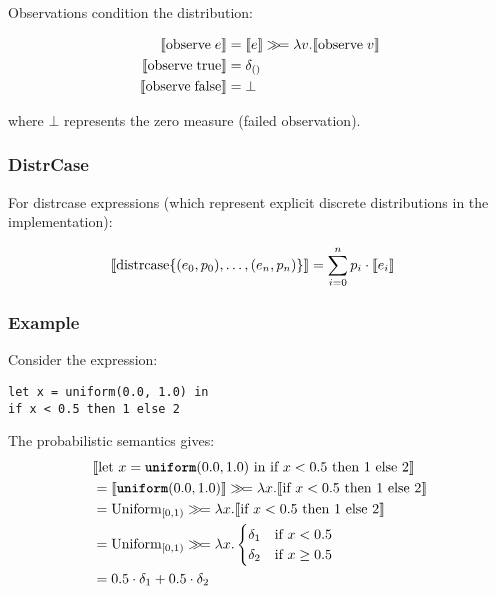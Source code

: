 Observations condition the distribution:

\begin{align*}
\llbracket  \text{observe}\; e  \rrbracket &= \llbracket  e  \rrbracket \gg\!= \lambda v. \llbracket  \text{observe}\; v  \rrbracket \\
\llbracket  \text{observe}\; \text{true}  \rrbracket &= \delta_{()} \\
\llbracket  \text{observe}\; \text{false}  \rrbracket &= \bot
\end{align*}

where $\bot$ represents the zero measure (failed observation).

\subsubsection{DistrCase}

For distrcase expressions (which represent explicit discrete distributions in the implementation):

\begin{align*}
\llbracket  \text{distrcase}\{(e_0, p_0), \ldots, (e_n, p_n)\}  \rrbracket &= \sum_{i=0}^n p_i \cdot \llbracket  e_i  \rrbracket
\end{align*}

\subsubsection{Example}

Consider the expression:
\begin{lstlisting}
let x = uniform(0.0, 1.0) in
if x < 0.5 then 1 else 2
\end{lstlisting}

The probabilistic semantics gives:
\begin{align*}
&\llbracket  \text{let } x = \text{\ttfamily\bfseries uniform}(0.0, 1.0) \text{ in if } x < 0.5 \text{ then } 1 \text{ else } 2  \rrbracket \\
&= \llbracket  \text{\ttfamily\bfseries uniform}(0.0, 1.0)  \rrbracket \gg\!= \lambda x. \llbracket  \text{if } x < 0.5 \text{ then } 1 \text{ else } 2  \rrbracket \\
&= \text{Uniform}_{[0,1)} \gg\!= \lambda x. \llbracket  \text{if } x < 0.5 \text{ then } 1 \text{ else } 2  \rrbracket \\
&= \text{Uniform}_{[0,1)} \gg\!= \lambda x. \begin{cases}
    \delta_1 & \text{if } x < 0.5 \\
    \delta_2 & \text{if } x \geq 0.5
\end{cases} \\
&= 0.5 \cdot \delta_1 + 0.5 \cdot \delta_2
\end{align*}

